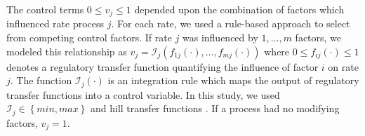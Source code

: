 \documentclass[11pt,letterpaper]{article}
\begin{document}

The control terms $0\leq v_{j}\leq 1$ depended upon the combination of factors which influenced rate process $j$.
For each rate, we used a rule-based approach to select from competing control factors.
If rate $j$ was influenced by $1,\dots,m$ factors, we modeled this relationship as
$v_{j}=\mathcal{I}_{j}\left(f_{1j}\left(\cdot\right),\hdots,f_{mj}\left(\cdot\right)\right)$
where $0\leq f_{ij}\left(\cdot\right)\leq 1$ denotes a regulatory transfer function quantifying the influence of factor $i$ on rate $j$.
The function $\mathcal{I}_{j}\left(\cdot\right)$ is an integration rule which maps the output of regulatory transfer functions into a control
variable. In this study, we used $\mathcal{I}_{j}\in\left\{min,max\right\}$ and hill transfer functions \cite{pr3010178,pr3010138}.
If a process had no modifying factors, $v_{j}=1$.

\end{document}
